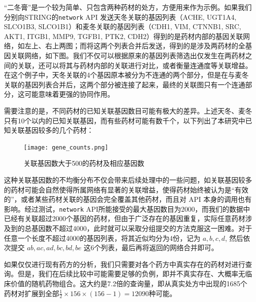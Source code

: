 “二冬膏”是一个较为简单、只包含两种药材的处方，方便用来作为示例。如果我们分别向STRING的\texttt{network} API 发送天冬关联的基因列表（ACHE, UGT1A4, SLCO1B3, SLCO1B1）和麦冬关联的基因列表（CDH1, VIM, CTNNB1, SRC, AKT1, ITGB1, MMP9, TGFB1, PTK2, CDH2）得到的是药材内部的基因关联网络，如左上、右上两图；而将这两个列表合并后发送，得到的是涉及两药材的全基因关联网络，如下图。我们不仅可以根据原来的基因列表筛选出仅发生在两药材之间的关联，还可以将其与药材内部的关联进行对比，或者衡量连通度等关联增益。在这个例子中，天冬关联的4个基因原本被分为不连通的两个部分，但是在与麦冬关联的基因列表合并后，这两个部分被连接了起来，最终的关联图只有一个连通部分，这可能意味着更强的协同作用。

需要注意的是，不同药材的已知关联基因数目可能有极大的差异。上述天冬、麦冬只有10个以内的已知关联基因，而有些药材可能有数千个，以下列出了本研究中已知关联基因较多的几个药材：

\begin{figure}[H]
  \centering
  \texttt{[image: gene\_counts.png]}
  \caption{关联基因数大于500的药材及相应基因数}
  \label{fig:top_genes}
\end{figure}

这种关联基因数的不均衡分布不仅会带来后续处理中的一些问题，如关联基因较多的药材可能会自然使得所属网络有显著的关联增益，使得药材始终被认为是“有效的”，或者某些药材关联的基因会完全覆盖其他药材，而且对 API 本身的调用也有影响。经过测试，\texttt{network} API所能接受的最大基因数目为2000，而我们的数据中已经有关联超过2000个基因的药材，但由于广泛存在的基因重复，实际任意药材涉及到的总基因数不超过4000，此时就可以采取分组提交的方法克服这一困难。对于任意一个长度不超过4000的基因列表，将其近似均分为4份，记为 $a, b, c, d$, 然后依次提交 $ab, ac, ad, bc, bd, be$ 这6个列表，最后再将返回的网络合并即可。

如果仅仅进行现有药方的分析，我们只需要对各个药方中真实存在的药材对进行查询。但是，我们在后续比较中可能需要足够的负例，即并不真实存在、大概率无临床价值的随机药物组合。这大约是7.2倍的查询量，即从真实处方中出现的1685个药材对扩展到全部$\frac{1}{2} \times 156 \times (156 - 1) = 12090$种可能。
